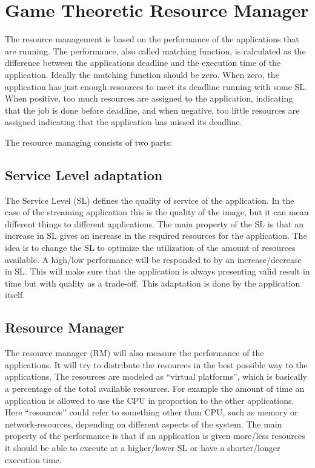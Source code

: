 \documentclass[nobiblatex]{LTHthesis}
\begin{document}
\section{Game Theoretic Resource Manager}
The resource management is based on the performance of the applications that are running. The performance, also called matching function, is calculated as the difference between the applications deadline and the execution time of the application. Ideally the matching function should be zero. When zero, the  application has just enough resources to meet its deadline running with some SL. When positive, too much resources are assigned to the application, indicating that the job is done before deadline, and when negative, too little resources are assigned indicating that the application has missed its deadline.

The resource managing consists of two parts:
\subsection{Service Level adaptation}
The Service Level (SL) defines the quality of service of the application. In the case of the streaming application this is the quality of the image, but it can mean different things to different applications. The main property of the SL is that an increase in SL gives an increase in the required resources for the application. The idea is to change the SL to optimize the utilization of the amount of resources available. A high/low performance will be responded to by an increase/decrease in SL.
This will make sure that the application is always presenting valid result in time but with quality as a trade-off. This adaptation is done by the application itself.

\subsection{Resource Manager}
The resource manager (RM) will also measure the performance of the applications. It will try to distribute the resources in the best possible way to the applications. The resources are modeled as “virtual platforms”, which is basically a percentage of the total available resources. For example the amount of time an application is allowed to use the CPU in proportion to the other applications. Here “resources” could refer to something other than CPU, such as memory or network-resources, depending on different aspects of the system. The main property of the performance is that if an application is given more/less resources it should be able to execute at a higher/lower SL or have a shorter/longer execution time.
\end{document}
